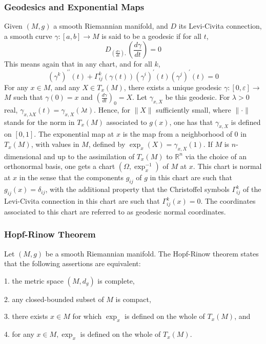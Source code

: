 \documentclass[12pt,hyperref,a4paper,UTF8]{ctexart}
\begin{document}
\subsubsection{Geodesics and Exponential Maps}
Given $(M, g)$ a smooth Riemannian manifold, and $D$ its Levi-Civita connection, a smooth curve $\gamma:[a, b] \rightarrow M$ is said to be a geodesic if for all $t$,
$$
D_{\left(\frac{d \gamma}{d t}\right),}\left(\frac{d \gamma}{d t}\right)=0
$$
This means again that in any chart, and for all $k$,
$$
\left(\gamma^k\right)^{\prime \prime}(t)+\Gamma_{i j}^k(\gamma(t))\left(\gamma^i\right)^{\prime}(t)\left(\gamma^j\right)^{\prime}(t)=0
$$
For any $x \in M$, and any $X \in T_x(M)$, there exists a unique geodesic $\gamma:[0, \varepsilon] \rightarrow$ $M$ such that $\gamma(0)=x$ and $\left(\frac{d \gamma}{d t}\right)_0=X$. Let $\gamma_{x, X}$ be this geodesic. For $\lambda>0$ real, $\gamma_{x, \lambda X}(t)=\gamma_{x, X}(\lambda t)$. Hence, for $\|X\|$ sufficiently small, where $\|\cdot\|$ stands for the norm in $T_x(M)$ associated to $g(x)$, one has that $\gamma_{x, X}$ is defined on $[0,1]$. The exponential map at $x$ is the map from a neighborhood of 0 in $T_x(M)$, with values in $M$, defined by $\exp _x(X)=\gamma_{x, X}(1)$. If $M$ is $n$-dimensional and up to the assimilation of $T_x(M)$ to $\mathbb{R}^n$ via the choice of an orthonormal basis, one gets a chart $\left(\Omega, \exp _x^{-1}\right)$ of $M$ at $x$. This chart is normal at $x$ in the sense that the components $g_{i j}$ of $g$ in this chart are such that $g_{i j}(x)=\delta_{i j}$, with the additional property that the Christoffel symbols $\Gamma_{i j}^k$ of the Levi-Civita connection in this chart are such that $\Gamma_{i j}^k(x)=0$. The coordinates associated to this chart are referred to as geodesic normal coordinates.

\subsubsection{Hopf-Rinow Theorem}
Let $(M, g)$ be a smooth Riemannian manifold. The Hopf-Rinow theorem states that the following assertions are equivalent:

1. the metric space $\left(M, d_g\right)$ is complete,

2. any closed-bounded subset of $M$ is compact,

3. there exists $x \in M$ for which $\exp _x$ is defined on the whole of $T_x(M)$, and

4. for any $x \in M, \exp _x$ is defined on the whole of $T_x(M)$.
\end{document}

